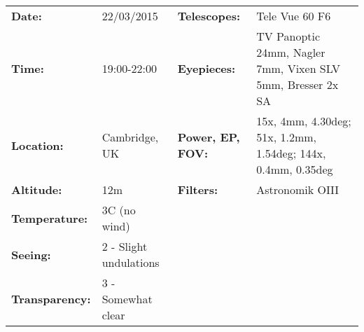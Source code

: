 \begin{tabular}{ p{0.9in} p{1.3in} p{1.2in} p{5.2in}}
{\bf Date:} & 22/03/2015 & {\bf Telescopes:} & Tele Vue 60 F6 \\ 
{\bf Time:} & 19:00-22:00 & {\bf Eyepieces:} & TV Panoptic 24mm, Nagler 7mm, Vixen SLV 5mm, Bresser 2x SA \\ 
{\bf Location:} & Cambridge, UK & {\bf Power, EP, FOV:} & 15x, 4mm, 4.30deg; 51x, 1.2mm, 1.54deg; 144x, 0.4mm, 0.35deg \\ 
{\bf Altitude:} & 12m & {\bf Filters:} & Astronomik OIII \\ 
{\bf Temperature:} & 3C (no wind) & & \\ 
{\bf Seeing:} & 2 - Slight undulations & & \\ 
{\bf Transparency:} & 3 - Somewhat clear & & \\ 
\end{tabular}
\centering 
